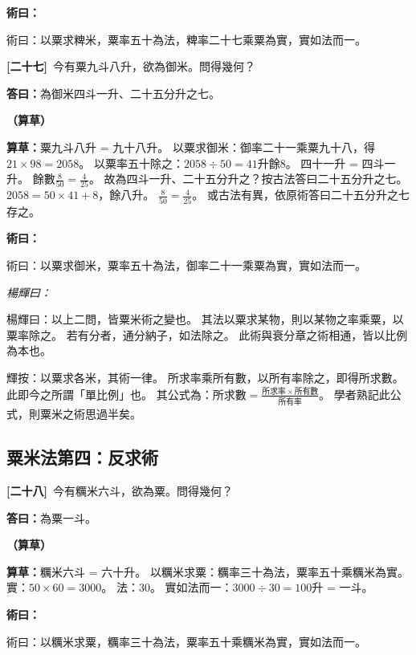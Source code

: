 \documentclass[11pt,a4paper]{article}
\newenvironment{method}{%
  \par\noindent\textcolor{methodcolor}{\textbf{術曰：}}%
  \ignorespaces
}{\par\vspace{0.5em}}
\newenvironment{caocao}{%
  \par\noindent\textcolor{caocaocolor}{\small\textbf{（算草）}}%
  \ignorespaces
}{\par\vspace{0.5em}}
\newenvironment{yanghuicomment}{%
  \par\noindent\textcolor{commentarycolor}{\small\textit{楊輝曰：}}%
  \ignorespaces
}{\par\vspace{0.5em}}
\newcommand{\problemnum}[1]{\textbf{[\ignorespaces#1\unskip]}}
\begin{document}
\begin{method}
術曰：以粟求粺米，粟率五十為法，粺率二十七乘粟為實，實如法而一。
\end{method}

\noindent\problemnum{二十七}\,
今有粟九斗八升，欲為御米。問得幾何？

\noindent\textcolor{answercolor}{\textbf{答曰：}}為御米四斗一升、二十五分升之七。

\begin{caocao}
\textbf{算草：}粟九斗八升 = 九十八升。
以粟求御米：御率二十一乘粟九十八，得$21 \times 98 = 2058$。
以粟率五十除之：$2058 \div 50 = 41$升餘$8$。
四十一升 = 四斗一升。
餘數$\frac{8}{50} = \frac{4}{25}$。
故為四斗一升、二十五分升之？按古法答曰二十五分升之七。
$2058 = 50 \times 41 + 8$，餘八升。
$\frac{8}{50} = \frac{4}{25}$。
或古法有異，依原術答曰二十五分升之七存之。
\end{caocao}

\begin{method}
術曰：以粟求御米，粟率五十為法，御率二十一乘粟為實，實如法而一。
\end{method}

\begin{yanghuicomment}
楊輝曰：以上二問，皆粟米術之變也。
其法以粟求某物，則以某物之率乘粟，以粟率除之。
若有分者，通分納子，如法除之。
此術與衰分章之術相通，皆以比例為本也。

輝按：以粟求各米，其術一律。
所求率乘所有數，以所有率除之，即得所求數。
此即今之所謂「單比例」也。
其公式為：$所求數 = \frac{所求率 \times 所有數}{所有率}$。
學者熟記此公式，則粟米之術思過半矣。
\end{yanghuicomment}

\subsection{粟米法第四：反求術}

\noindent\problemnum{二十八}\,
今有糲米六斗，欲為粟。問得幾何？

\noindent\textcolor{answercolor}{\textbf{答曰：}}為粟一斗。

\begin{caocao}
\textbf{算草：}糲米六斗 = 六十升。
以糲米求粟：糲率三十為法，粟率五十乘糲米為實。
實：$50 \times 60 = 3000$。
法：$30$。
實如法而一：$3000 \div 30 = 100$升 = 一斗。
\end{caocao}

\begin{method}
術曰：以糲米求粟，糲率三十為法，粟率五十乘糲米為實，實如法而一。
\end{method}
\end{document}
